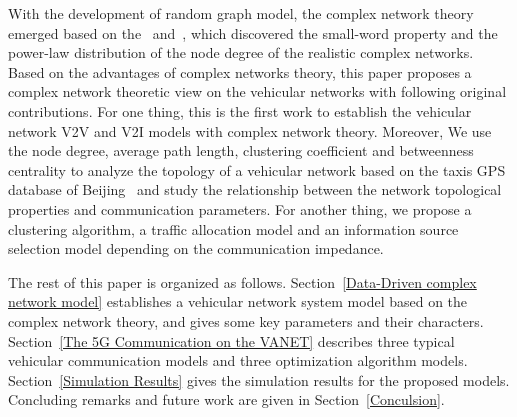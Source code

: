 \documentclass[journal,12pt,draftclsnofoot,onecolumn]{IEEEtran}
\begin{document}
With the development of random graph model, the complex network theory emerged based on the~\cite{watts1998collective} and~\cite{barabasi1999emergence}, which discovered the small-word property and the power-law distribution of the node degree of the realistic complex networks. Based on the advantages of complex networks theory, this paper proposes a complex network theoretic view on the vehicular networks with following original contributions.
For one thing, this is the first work to establish the vehicular network V2V and V2I models with complex network theory. Moreover, We use the node degree, average path length, clustering coefficient and betweenness centrality to analyze the topology of a vehicular network based on the taxis GPS database of Beijing~\cite{yuan2010t} and study the relationship between the network topological properties and communication parameters. For another thing, we propose a clustering algorithm, a traffic allocation model and an information source selection model depending on the communication impedance.

The rest of this paper is organized as follows. Section~\ref{Data-Driven complex network model} establishes a vehicular network system model based on the complex network theory, and gives some key parameters and their characters. Section~\ref{The 5G Communication on the VANET} describes three typical vehicular communication models and three optimization algorithm models. Section~\ref{Simulation Results} gives the simulation results for the proposed models. Concluding remarks and future work are given in Section~\ref{Conculsion}.

%
%
%
%
\end{document}
